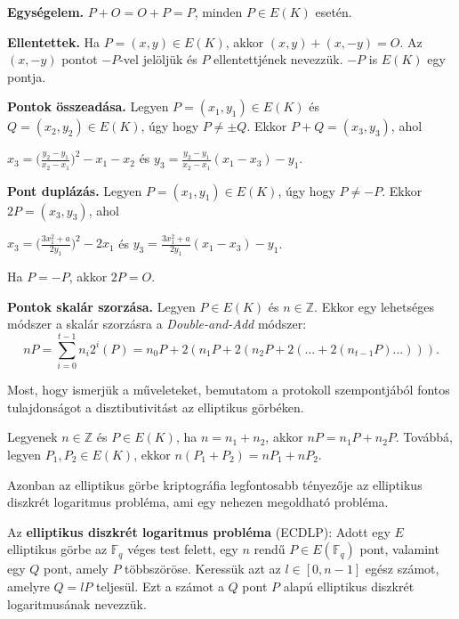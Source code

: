 \begin{outdentlist}
    \item[]
    \textbf{Egységelem.} $P + O = O + P = P$, minden $P \in E(K)$ esetén.

    \item[]
    \textbf{Ellentettek.} Ha $P = (x, y) \in E(K)$, akkor $(x, y) + (x, -y) = O$. Az $(x, -y)$ pontot $-P$-vel jelöljük és $P$ ellentettjének nevezzük. $-P$ is $E(K)$ egy pontja.

    \item[]
    \textbf{Pontok összeadása.} Legyen $P = (x_1, y_1) \in E(K)$ és $Q = (x_2, y_2) \in E(K)$, úgy hogy $P \neq \pm Q$. Ekkor $P + Q = (x_3, y_3)$, ahol 
    \begin{center}$x_3 = \big(\frac{y_2 - y_1}{x_2 - x_1}\big)^2 - x_1 - x_2$ és $y_3 = \frac{y_2 - y_1}{x_2 - x_1}(x_1 - x_3) - y_1$.\end{center}

    \item[]
    \textbf{Pont duplázás.} Legyen $P = (x_1, y_1) \in E(K)$, úgy hogy $P \neq -P$. Ekkor $2P = (x_3, y_3)$, ahol
    \begin{center}$x_3 = \big(\frac{3x_1^2 + a}{2y_1}\big)^2 - 2x_1$ és $y_3 = \frac{3x_1^2 + a}{2y_1}(x_1 - x_3) - y_1$.\end{center} Ha $P = -P$, akkor $2P = O$.

    \item[]
    \textbf{Pontok skalár szorzása.} Legyen $P \in E(K)$ és $n \in \mathbb{Z}$. Ekkor egy lehetséges módszer a skalár szorzásra a \textit{Double-and-Add} módszer: $$nP = \sum_{i = 0}^{t-1} n_i 2^i(P) = n_0P + 2(n_1P + 2(n_2P + 2(... + 2(n_{t-1}P)...))).$$
\end{outdentlist}

Most, hogy ismerjük a műveleteket, bemutatom a protokoll szempontjából fontos tulajdonságot a disztibutivitást az elliptikus görbéken.

Legyenek $n \in \mathbb{Z}$ és $P \in E(K)$, ha $n = n_1 + n_2$, akkor $nP = n_1P + n_2P$. Továbbá, legyen $P_1, P_2 \in E(K)$, ekkor $n(P_1 + P_2) = nP_1 + nP_2$.

Azonban az elliptikus görbe kriptográfia legfontosabb tényezője az elliptikus diszkrét logaritmus probléma, ami egy nehezen megoldható probléma.

\begin{definition*}
    Az \textbf{elliptikus diszkrét logaritmus probléma} (ECDLP): Adott egy $E$ elliptikus görbe az $\mathbb{F}_q$ véges test felett, egy $n$ rendű $P \in E(\mathbb{F}_q)$ pont, valamint egy $Q$ pont, amely $P$ többszöröse. Keressük azt az $l \in [0, n - 1]$ egész számot, amelyre $Q = lP$ teljesül. Ezt a számot a $Q$ pont $P$ alapú elliptikus diszkrét logaritmusának nevezzük.
\end{definition*}

